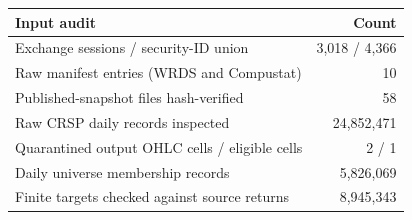 \begin{tabular}{lr}
\toprule
Input audit & Count \\
\midrule
Exchange sessions / security-ID union & 3,018 / 4,366 \\
Raw manifest entries (WRDS and Compustat) & 10 \\
Published-snapshot files hash-verified & 58 \\
Raw CRSP daily records inspected & 24,852,471 \\
Quarantined output OHLC cells / eligible cells & 2 / 1 \\
Daily universe membership records & 5,826,069 \\
Finite targets checked against source returns & 8,945,343 \\
\bottomrule
\end{tabular}
